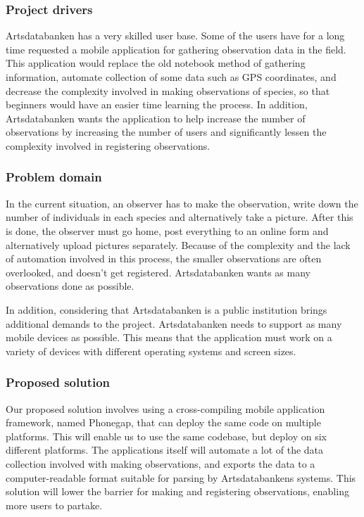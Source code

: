 \subsubsection{Project drivers}
Artsdatabanken has a very skilled user base. Some of the users have for a long
time requested a mobile application for gathering observation data in the
field. This application would replace the old notebook method of gathering
information, automate collection of some data such as GPS coordinates, and
decrease the complexity involved in making observations of species, so that
beginners would have an easier time learning the process. In addition,
Artsdatabanken wants the application to help increase the number of
observations by increasing the number of users and significantly lessen the
complexity involved in registering observations.

\subsubsection{Problem domain}
In the current situation, an observer has to make the observation, write down
the number of individuals in each species and alternatively take a picture. After this is done,
the observer must go home, post everything to an online form and
alternatively upload pictures separately. Because of the complexity and the
lack of automation involved in this process, the smaller observations are often
overlooked, and doesn't get registered. Artsdatabanken wants as many
observations done as possible.

In addition, considering that Artsdatabanken is a public institution brings
additional demands to the project. Artsdatabanken needs to support as many
mobile devices as possible. This means that the application must work on
a variety of devices with different operating systems and screen sizes.

\subsubsection{Proposed solution}
Our proposed solution involves using a cross-compiling mobile application
framework, named Phonegap, that can deploy the same code on multiple platforms.
This will enable us to use the same codebase, but deploy on six different
platforms. The applications itself will automate a lot of the data collection
involved with making observations, and exports the data to a computer-readable
format suitable for parsing by Artsdatabankens systems. This solution will
lower the barrier for making and registering observations, enabling more users
to partake.

